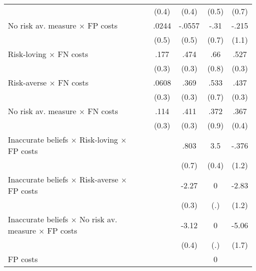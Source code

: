 \begin{table}[htbp]
\begin{tabular}{l*{5}{c}}
                &                  &    (0.4)         &    (0.4)         &    (0.5)         &    (0.7)         \\
No risk av. measure $\times$ FP costs&                  &    .0244         &   -.0557         &     -.31         &    -.215         \\
                &                  &    (0.5)         &    (0.5)         &    (0.7)         &    (1.1)         \\
Risk-loving $\times$ FN costs&                  &     .177         &     .474\sym{*}  &      .66         &     .527\sym{*}  \\
                &                  &    (0.3)         &    (0.3)         &    (0.8)         &    (0.3)         \\
Risk-averse $\times$ FN costs&                  &    .0608         &     .369         &     .533         &     .437         \\
                &                  &    (0.3)         &    (0.3)         &    (0.7)         &    (0.3)         \\
No risk av. measure $\times$ FN costs&                  &     .114         &     .411         &     .372         &     .367         \\
                &                  &    (0.3)         &    (0.3)         &    (0.9)         &    (0.4)         \\
Inaccurate beliefs $\times$ Risk-loving $\times$ FP costs&                  &                  &     .803         &      3.5\sym{***}&    -.376         \\
                &                  &                  &    (0.7)         &    (0.4)         &    (1.2)         \\
Inaccurate beliefs $\times$ Risk-averse $\times$ FP costs&                  &                  &    -2.27\sym{***}&        0         &    -2.83\sym{**} \\
                &                  &                  &    (0.3)         &      (.)         &    (1.2)         \\
Inaccurate beliefs $\times$ No risk av. measure $\times$ FP costs&                  &                  &    -3.12\sym{***}&        0         &    -5.06\sym{***}\\
                &                  &                  &    (0.4)         &      (.)         &    (1.7)         \\
FP costs        &                  &                  &                  &        0         &                  \\

\end{tabular}
\end{table}
